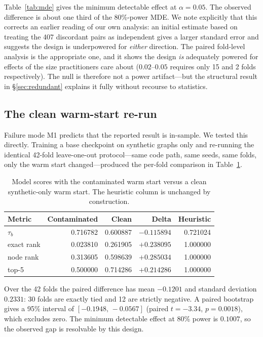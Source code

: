 \documentclass[conference]{IEEEtran}
\begin{document}
Table~\ref{tab:mde} gives the minimum detectable effect at $\alpha=0.05$. The observed
difference is about one third of the 80\%-power MDE. We note explicitly that this
corrects an earlier reading of our own analysis: an initial estimate based on treating the
407 discordant pairs as independent gives a larger standard error and suggests the design
is underpowered for \emph{either} direction. The paired fold-level analysis is the
appropriate one, and it shows the design \emph{is} adequately powered for effects of the
size practitioners care about ($0.02$--$0.05$ requires only 15 and 2 folds
respectively). The null is therefore not a power artifact---but the structural result in
\S\ref{sec:redundant} explains it fully without recourse to statistics.

\subsection{The clean warm-start re-run}

\label{sec:cleanrerun}
Failure mode M1 predicts that the reported result is in-sample. We tested this directly.
Training a base checkpoint on synthetic graphs only and re-running the identical 42-fold
leave-one-out protocol---same code path, same seeds, same folds, only the warm start
changed---produced the per-fold comparison in Table~\ref{tab:clean}.

\begin{table}[t]
\centering
\caption{Model scores with the contaminated warm start versus a clean synthetic-only
warm start. The heuristic column is unchanged by construction.}
\label{tab:clean}
\begin{tabular}{@{}lrrrr@{}}
\toprule
\textbf{Metric} & \textbf{Contaminated} & \textbf{Clean} & \textbf{Delta} &
\textbf{Heuristic} \\
\midrule
$\tau_b$   & 0.716782 & 0.600887 & $-0.115894$ & 0.721024 \\
exact rank & 0.023810 & 0.261905 & $+0.238095$ & 1.000000 \\
node rank  & 0.313605 & 0.598639 & $+0.285034$ & 1.000000 \\
top-5      & 0.500000 & 0.714286 & $+0.214286$ & 1.000000 \\
\bottomrule
\end{tabular}
\end{table}

Over the 42 folds the paired difference has mean $-0.1201$ and standard deviation
$0.2331$: 30 folds are exactly tied and 12 are strictly negative. A paired bootstrap gives
a 95\% interval of $[-0.1948,\,-0.0567]$ (paired $t=-3.34$, $p=0.0018$), which excludes
zero. The minimum detectable effect at 80\% power is $0.1007$, so the observed gap is
resolvable by this design.
\end{document}
